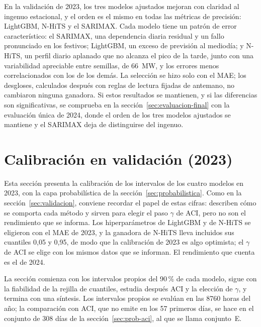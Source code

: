 En la validación de 2023, los tres modelos ajustados mejoran con claridad al
ingenuo estacional, y el orden es el mismo en todas las métricas de
precisión: LightGBM, N-HiTS y el SARIMAX. Cada modelo tiene un patrón de error
característico: el SARIMAX, una dependencia diaria residual y un fallo
pronunciado en los festivos; LightGBM, un exceso de previsión al mediodía; y
N-HiTS, un perfil diario aplanado que no alcanza el pico de la tarde, junto
con una variabilidad apreciable entre semillas, de 66~MW, y los errores menos
correlacionados
con los de los demás. La selección se hizo solo con el MAE; los desgloses,
calculados después con reglas de lectura fijadas de antemano, no cambiaron
ninguna ganadora. Si estos resultados se mantienen, y si las diferencias son
significativas, se comprueba en la sección~\ref{sec:evaluacion-final} con la
evaluación única de 2024, donde el orden de los tres modelos ajustados se
mantiene y el SARIMAX deja de distinguirse del ingenuo.

\section{Calibración en validación (2023)}\label{sec:calibracion}

Esta sección presenta la calibración de los intervalos de los cuatro modelos en
2023, con la capa probabilística de la sección~\ref{sec:probabilistica}. Como
en la sección~\ref{sec:validacion}, conviene recordar el papel de estas cifras:
describen cómo se comporta cada método y sirven para elegir el paso $\gamma$ de
ACI, pero no son el rendimiento que se informa. Los hiperparámetros de LightGBM
y de N-HiTS se eligieron con el MAE de 2023, y la ganadora de N-HiTS lleva
incluidos sus cuantiles 0,05 y 0,95, de modo que la calibración de 2023 es
algo optimista; el $\gamma$ de ACI se elige con los mismos datos que se
informan. El rendimiento que cuenta es el de 2024.

La sección comienza con los intervalos propios del 90\,\% de cada modelo,
sigue con la fiabilidad de la rejilla de cuantiles, estudia después ACI y la
elección de $\gamma$, y termina con una síntesis. Los intervalos propios se
evalúan en las 8760 horas del año; la comparación con ACI, que no emite en los
57 primeros días, se hace en el conjunto de 308 días de la
sección~\ref{sec:prob-aci}, al que se llama conjunto~E.

